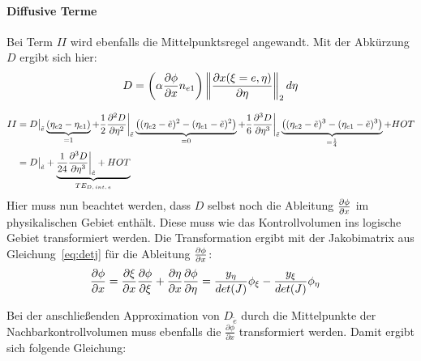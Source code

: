 \paragraph{Diffusive Terme}
\noindent
Bei Term $II$ wird ebenfalls die Mittelpunktsregel angewandt. Mit der Abkürzung $D$
ergibt sich hier:
\begin{equation*}
  D=  \left({\alpha \pder[\phi]{x} n_{e1}}\right)
  \left\lVert \frac{\partial x(\xi=e, \eta)}{\partial \eta} \right\rVert_2 d\eta
\end{equation*}

\begin{align*}
  II&= D\big\vert_{\tilde{e}} \underbrace{(\etaii-\etai)}_{=1} + \frac{1}{2}
  \frac{\partial^2 D}{\partial \eta^2} \bigg\vert_{\tilde{e}}
  \underbrace{\left({(\etaii-\etilde)^2-(\etai-\etilde)^2}\right)}_{=0}
  +\frac{1}{6} \frac{\partial^3 D}{\partial \eta^3}\bigg\vert_{\tilde{e}}
  \underbrace{\left({(\etaii-\etilde)^3-(\etai-\etilde)^3}\right)}_{=\frac{1}{4}} + HOT\\
  &= D \big\vert_{\tilde{e}}+ \underbrace{\frac{1}{24}  \frac{\partial^3 D}{\partial \eta^3}
\bigg\vert_{\tilde{e}}+HOT}_{TE_{D,\,int,\,e}}
\end{align*}
Hier muss nun beachtet werden, dass $D$ selbst noch die Ableitung $\pder[\phi]{x}$ im physikalischen Gebiet enthält.
Diese muss wie das Kontrollvolumen ins logische Gebiet transformiert werden. Die Transformation ergibt
mit der Jakobimatrix aus Gleichung~\eqref{eq:detj} für
die Ableitung $\pder[\phi]{x}$:%
\begin{align}
  \pder[\phi]{x}&=\pder[\xi]{x}\pder[\phi]{\xi}+\pder[\eta]{x}\pder[\phi]{\eta}
  = \frac{\yeta}{det(J)} \phi_{\xi} - \frac{\yxi}{det(J)} \phi_{\eta}
\end{align}

Bei der anschließenden Approximation von $D_{\tilde{e}}$ durch die Mittelpunkte der Nachbarkontrollvolumen
muss ebenfalls die $\frac{\partial \phi}{\partial x}$ transformiert werden. Damit ergibt sich folgende Gleichung:




